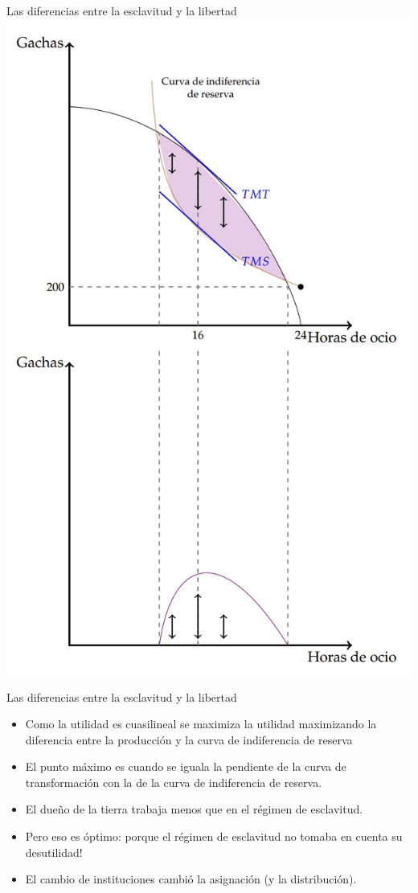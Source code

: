 \documentclass{beamer}
\begin{document}
\begin{frame}{Las diferencias entre la esclavitud y la libertad}
\centering
\includegraphics[scale=0.55]{Slides Principios de Economia/Figures/Instituciones2.jpg}
\end{frame}


\begin{frame}{Las diferencias entre la esclavitud y la libertad}
\begin{itemize}
    \item Como la utilidad es cuasilineal se maximiza la utilidad maximizando la diferencia entre la producción y la curva de indiferencia de reserva
     \item El punto máximo es cuando se iguala la pendiente de la curva de transformación con la de la curva de indiferencia de reserva. 
    \item El dueño de la tierra trabaja menos que en el régimen de esclavitud.\vspace{4mm}
    \item Pero eso es óptimo: porque el régimen de esclavitud no tomaba en cuenta su desutilidad! \vspace{4mm}
    \item  El cambio de instituciones cambió la asignación (y la distribución).
\end{itemize}
\end{frame}
\end{document}

